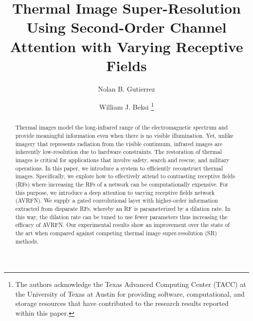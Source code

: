 \documentclass[runningheads]{llncs}
\begin{document}
\title{
Thermal Image Super-Resolution Using Second-Order Channel Attention with Varying Receptive Fields
}

\author{Nolan B. Gutierrez \and William J. Beksi
\thanks{
The authors acknowledge the Texas Advanced Computing Center (TACC) at the
University of Texas at Austin for providing software, computational, and
storage resources that have contributed to the research results reported within
this paper.}
}

\maketitle
\pagestyle{plain}                                                                                                                                             

\begin{abstract}
Thermal images model the long-infrared range of the electromagnetic spectrum and
provide meaningful information even when there is no visible illumination. Yet,
unlike imagery that represents radiation from the visible continuum, infrared
images are inherently low-resolution due to hardware constraints. The
restoration of thermal images is critical for applications that involve safety,
search and rescue, and military operations. In this paper, we introduce a system
to efficiently reconstruct thermal images. Specifically, we explore how to
effectively attend to contrasting receptive fields (RFs) where increasing the
RFs of a network can be computationally expensive. For this purpose, we
introduce a deep attention to varying receptive fields network (AVRFN). We
supply a gated convolutional layer with higher-order information extracted from
disparate RFs, whereby an RF is parameterized by a dilation rate. In this way,
the dilation rate can be tuned to use fewer parameters thus increasing the
efficacy of AVRFN. Our experimental results show an improvement over the state
of the art when compared against competing thermal image super-resolution (SR)
methods.
\end{abstract}
\end{document}
